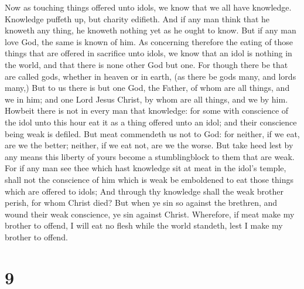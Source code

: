 Now as touching things offered unto idols, we know that
we all have knowledge. Knowledge puffeth up, but charity edifieth.
 And if any man think that he knoweth any thing, he
knoweth nothing yet as he ought to know.  But if any man
love God, the same is known of him.  As concerning
therefore the eating of those things that are offered in sacrifice unto
idols, we know that an idol is nothing in the world, and that there is
none other God but one.  For though there be that are
called gods, whether in heaven or in earth, (as there be gods many, and
lords many,)  But to us there is but one God, the Father,
of whom are all things, and we in him; and one Lord Jesus Christ, by
whom are all things, and we by him.  Howbeit there is not
in every man that knowledge: for some with conscience of the idol unto
this hour eat it as a thing offered unto an idol; and their conscience
being weak is defiled.  But meat commendeth us not to God:
for neither, if we eat, are we the better; neither, if we eat not, are
we the worse.  But take heed lest by any means this
liberty of yours become a stumblingblock to them that are weak.
 For if any man see thee which hast knowledge sit at meat
in the idol's temple, shall not the conscience of him which is weak be
emboldened to eat those things which are offered to idols;
 And through thy knowledge shall the weak brother perish,
for whom Christ died?  But when ye sin so against the
brethren, and wound their weak conscience, ye sin against Christ.
 Wherefore, if meat make my brother to offend, I will eat
no flesh while the world standeth, lest I make my brother to offend.

\hypertarget{section-8}{%
\section{9}\label{section-8}}

